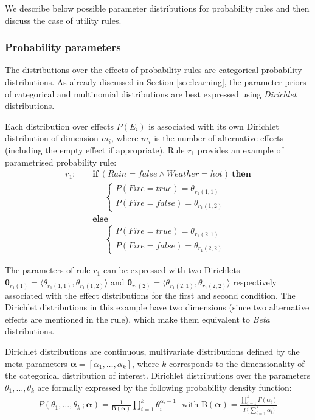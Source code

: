 We describe below possible parameter distributions for probability rules and then discuss the case of utility rules.  

\subsubsection*{Probability parameters}

The distributions over the effects of probability rules are categorical probability distributions.  As already discussed in Section \ref{sec:learning}, the parameter priors of categorical and multinomial distributions are best expressed using \textit{Dirichlet} distributions. 

Each distribution over effects $P(E_i)$ is associated with its own Dirichlet distribution of dimension $m_i$, where $m_i$ is the number of alternative effects (including the empty effect if appropriate).  Rule $r_{1}$ provides an example of parametrised probability rule: 
\begin{align*}
r_{1}: \ \ \ \ \ & \textbf{if} \ (\mathit{Rain}\!=\!\mathit{false} \land \mathit{Weather}\!=\!\mathit{hot}) \ \textbf{then} \\
& \;\;\;\;\;  \begin{cases}
 P(\mathit{Fire}\!=\!\mathit{true}) = \theta_{r_{1}(1,1)} \\ 
P(\mathit{Fire}\!=\!\mathit{false}) = \theta_{r_{1}(1,2)}
\end{cases}  \\ 
& \textbf{else} \\
& \;\;\;\;\; \begin{cases}
P(\mathit{Fire}\!=\!\mathit{true}) = \theta_{r_{1}(2,1)} \\
P(\mathit{Fire}\!=\!\mathit{false}) = \theta_{r_{1}(2,2)}
\end{cases} 
\end{align*}


The parameters of rule $r_{1}$ can be expressed with two Dirichlets $\boldsymbol\theta_{r_{1}(1)} = \langle \theta_{r_{1}(1,1)},\theta_{r_{1}(1,2)} \rangle$ and $\boldsymbol\theta_{r_{1}(2)} = \langle \theta_{r_{1}(2,1)}, \theta_{r_{1}(2,2)} \rangle$ respectively associated with the effect distributions for the first and second condition.  The Dirichlet distributions in this example have two dimensions (since two alternative effects are mentioned in the rule), which make them equivalent to \textit{Beta} distributions. 

Dirichlet distributions are continuous, multivariate distributions defined by the meta-parameters $\boldsymbol\alpha = [\alpha_1, \dots, \alpha_k]$, where $k$ corresponds to the dimensionality of the categorical distribution of interest.  Dirichlet distributions over the parameters $\theta_1, \dots, \theta_k$ are formally expressed by the following probability density function:
\begin{align}
P(\theta_1, \dots, \theta_k\,; \boldsymbol\alpha) = \frac{1}{\mathrm{B}(\boldsymbol\alpha)} \prod_{i=1}^k \theta_i^{\alpha_i - 1} \ \ \ \text{with } \mathrm{B}(\boldsymbol\alpha) = \frac{\prod_{i=1}^k \Gamma(\alpha_i)}{\Gamma\bigl(\sum_{i=1}^k \alpha_i\bigr)}
\end{align}

